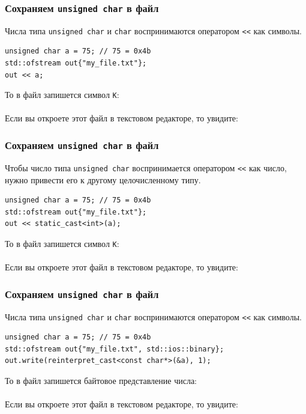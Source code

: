 \documentclass[10pt,pdf,hyperref={unicode}]{beamer}
\begin{document}
\begin{frame}[fragile]
\frametitle{Сохраняем \texttt{unsigned char} в файл}
Числа типа \texttt{unsigned char} и \texttt{char} воспринимаются оператором \texttt{<{}<} как символы.
\begin{lstlisting}
unsigned char a = 75; // 75 = 0x4b
std::ofstream out{"my_file.txt"};
out << a;
\end{lstlisting}
То в файл запишется символ \texttt{K}:\\
\noindent{}\\
Если вы откроете этот файл в текстовом редакторе, то увидите:
\noindent{}\\
\end{frame}


\begin{frame}[fragile]
\frametitle{Сохраняем \texttt{unsigned char} в файл}
Чтобы число типа \texttt{unsigned char} воспринимается оператором \texttt{<{}<} как число,
нужно привести его к другому целочисленному типу.
\begin{lstlisting}
unsigned char a = 75; // 75 = 0x4b
std::ofstream out{"my_file.txt"};
out << static_cast<int>(a);
\end{lstlisting}
То в файл запишется символ \texttt{K}:\\
\noindent{}\\
Если вы откроете этот файл в текстовом редакторе, то увидите:
\noindent{}\\
\end{frame}


\begin{frame}[fragile]
\frametitle{Сохраняем \texttt{unsigned char} в файл}
Числа типа \texttt{unsigned char} и \texttt{char} воспринимаются оператором \texttt{<{}<} как символы.
\begin{lstlisting}
unsigned char a = 75; // 75 = 0x4b
std::ofstream out{"my_file.txt", std::ios::binary};
out.write(reinterpret_cast<const char*>(&a), 1);
\end{lstlisting}
То в файл запишется байтовое представление числа:\\
\noindent{}\\
Если вы откроете этот файл в текстовом редакторе, то увидите:
\noindent{}\\
\end{frame}
\end{document}
